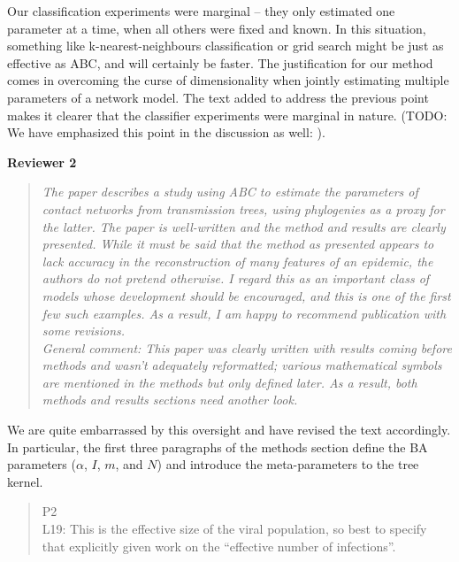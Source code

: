 \documentclass[12pt]{letter}
\begin{document}
\begin{letter}{ }
Our classification experiments were marginal -- they only estimated one
parameter at a time, when all others were fixed and known. In this situation,
something like k-nearest-neighbours classification or grid search might be just
as effective as ABC, and will certainly be faster. The justification for our
method comes in overcoming the curse of dimensionality when jointly estimating
multiple parameters of a network model. The text added to address the previous
point makes it clearer that the classifier experiments were marginal in nature.
(TODO: We have emphasized this point in the discussion as well: ).

\textbf{Reviewer 2}

\begin{quote}
  \itshape
  The paper describes a study using ABC to estimate the parameters of contact
  networks from transmission trees, using phylogenies as a proxy for the
  latter. The paper is well-written and the method and results are clearly
  presented. While it must be said that the method as presented appears to lack
  accuracy in the reconstruction of many features of an epidemic, the authors
  do not pretend otherwise. I regard this as an important class of models whose
  development should be encouraged, and this is one of the first few such
  examples. As a result, I am happy to recommend publication with some
  revisions. \\

  General comment: This paper was clearly written with results coming before
  methods and wasn't adequately reformatted; various mathematical symbols are
  mentioned in the methods but only defined later. As a result, both methods
  and results sections need another look.
\end{quote}

We are quite embarrassed by this oversight and have revised the text
accordingly. In particular, the first three paragraphs of the methods section
define the BA parameters ($\alpha$, $I$, $m$, and $N$) and introduce the
meta-parameters to the tree kernel.

\begin{quote}
  \itshape

  P2 \\
  L19: This is the effective size of the viral population, so best to specify
  that explicitly given work on the ``effective number of infections''.
\end{quote}


\begin{quote}
  \itshape


\end{quote}
\end{letter}
\end{document}
